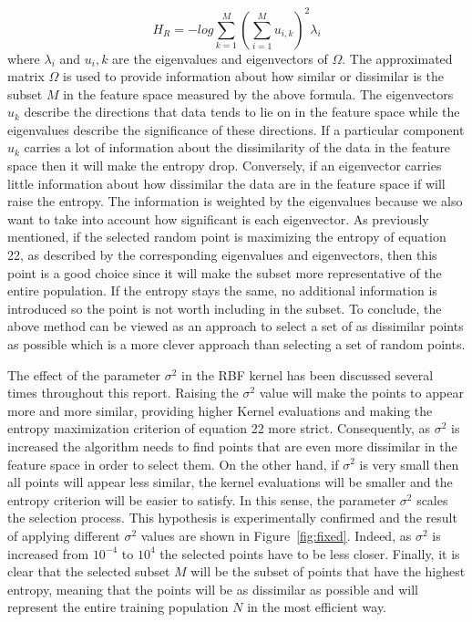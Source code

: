\documentclass[conference,compsoc]{IEEEtran}
\begin{document}
\begin{equation}
H_R= -log \sum_{k=1}^{M} (\sum_{i=1}^{M}u_{i,k})^2\lambda_i
\end{equation} 
where $\lambda_i$ and $u_i,k$ are the eigenvalues and eigenvectors of $\Omega$. The approximated matrix $\Omega$ is used to provide information about how similar or dissimilar is the subset $M$ in the feature space measured by the above formula. The eigenvectors $u_k$ describe the directions that data tends to lie on in the feature space while the eigenvalues describe the significance of these directions. If a particular component $u_k$ carries a lot of information about the dissimilarity of the data in the feature space then it will make the entropy drop. Conversely, if an eigenvector carries little information about how dissimilar the data are in the feature space if will raise the entropy. The information is weighted by the eigenvalues because we also want to take into account how significant is each eigenvector. As previously mentioned, if the selected random point is maximizing the entropy of equation 22, as described by the corresponding eigenvalues and eigenvectors, then this point is a good choice since it will make the subset more representative of the entire population. If the entropy stays the same, no additional information is introduced so the point is not worth including in the subset. To conclude, the above method can be viewed as an approach to select a set of as dissimilar points as possible which is a more clever approach than selecting a set of random points.

The effect of the parameter $\sigma^2$ in the RBF kernel has been discussed several times throughout this report. Raising the $\sigma^2$ value will make the points to appear more and more similar, providing higher Kernel evaluations and making the entropy maximization criterion of equation 22 more strict. Consequently, as $\sigma^2$ is increased the algorithm needs to find points that are even more dissimilar in the feature space in order to select them. On the other hand, if $\sigma^2$ is very small then all points will appear less similar, the kernel evaluations will be smaller and the entropy criterion will be easier to satisfy. In this sense, the parameter $\sigma^2$ scales the selection process.  This hypothesis is experimentally confirmed and the result of applying different $\sigma^2$
values are shown in Figure~\ref{fig:fixed}. Indeed, as $\sigma^2$ is increased from $10^{-4}$ to $10^4$ the selected points have to be less closer.  Finally, it is clear that the selected subset $M$ will be the subset of points that have the highest entropy, meaning that the points will be as dissimilar as possible and will represent the entire training population $N$ in the most efficient way.
\end{document}
